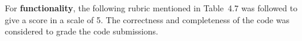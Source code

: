 



\newpage

For \textbf{functionality}, the following rubric mentioned in
Table~4.7 was followed to give a score in a scale of 5. The
correctness and completeness of the code was considered to
grade the code submissions.

